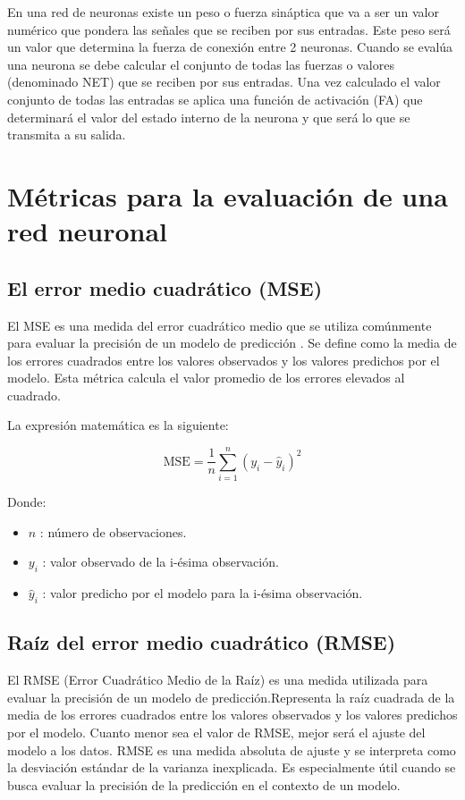 En una red de neuronas existe un peso o fuerza sináptica que va a ser un valor numérico que pondera las señales que se reciben por sus entradas. Este peso será un valor que determina la fuerza de conexión entre 2 neuronas. Cuando se evalúa una neurona se debe calcular el conjunto de todas las fuerzas o valores (denominado NET) que se reciben por sus entradas. Una vez calculado el valor conjunto de todas las entradas se aplica una función de activación (FA) que determinará el valor del estado interno de la neurona y que será lo que se transmita a su salida\cite{pose2009introduccion}.


\section{Métricas para la evaluación de una red neuronal}

\subsection{El error medio cuadrático (MSE) }

El MSE es una medida del error cuadrático medio que se utiliza comúnmente para evaluar la precisión de un modelo de predicción \cite{sepulveda2023analisis}.
Se define como la media de los errores cuadrados entre los valores observados y los valores predichos por el modelo. 
Esta métrica calcula el valor promedio de los errores elevados al
cuadrado\cite{chang2023comparacion}.

La expresión matemática es la siguiente:

\[
\text{MSE} = \frac{1}{n} \sum_{i=1}^{n} (y_i - \hat{y}_i)^2
\]

Donde:

\begin{itemize}
  \item $n$ : número de observaciones.
  \item $y_i$ : valor observado de la i-ésima observación.
  \item $\hat{y}_i$ : valor predicho por el modelo para la i-ésima observación.
\end{itemize}


\subsection{Raíz del error medio cuadrático (RMSE)}

El RMSE (Error Cuadrático Medio de la Raíz) es una medida utilizada para evaluar la precisión de un modelo de predicción.Representa la raíz cuadrada de la media de los errores cuadrados entre los valores observados y los valores predichos por el modelo. Cuanto menor sea el valor de RMSE, mejor será el ajuste del modelo a los datos\cite{sepulveda2023analisis}. 
RMSE es una medida absoluta de ajuste y se interpreta como la desviación estándar de la varianza inexplicada. Es especialmente útil cuando se busca evaluar la precisión de la predicción en el contexto de un modelo.


